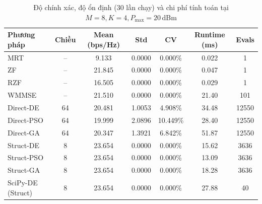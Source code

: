 \documentclass[12pt, a4paper]{article}
\begin{document}
\begin{table}[H]
    \centering
    \caption{Độ chính xác, độ ổn định (30 lần chạy) và chi phí tính toán tại $M=8, K=4, P_{\max}=20$\,dBm}
    \label{tab:stab}
    \begin{tabular}{l c c c c c c}
        \toprule
        \textbf{Phương pháp} & \textbf{Chiều} & \textbf{Mean (bps/Hz)} & \textbf{Std} & \textbf{CV} & \textbf{Runtime (ms)} & \textbf{Evals} \\
        \midrule
        MRT & -- & 9.133 & 0.0000 & 0.000\% & 0.022 & 1 \\
        ZF & -- & 21.845 & 0.0000 & 0.000\% & 0.047 & 1 \\
        RZF & -- & 16.505 & 0.0000 & 0.000\% & 0.029 & 1 \\
        WMMSE & -- & 21.510 & 0.0000 & 0.000\% & 21.40 & 101 \\
        Direct-DE & 64 & 20.481 & 1.0053 & 4.908\% & 34.48 & 12550 \\
        Direct-PSO & 64 & 19.999 & 2.0896 & 10.449\% & 28.40 & 12550 \\
        Direct-GA & 64 & 20.347 & 1.3921 & 6.842\% & 51.87 & 12550 \\
        Struct-DE & 8 & 23.654 & 0.0000 & 0.000\% & 15.62 & 3636 \\
        Struct-PSO & 8 & 23.654 & 0.0000 & 0.000\% & 13.09 & 3636 \\
        Struct-GA & 8 & 23.654 & 0.0000 & 0.000\% & 18.28 & 3636 \\
        SciPy-DE (Struct) & 8 & 23.654 & 0.0000 & 0.000\% & 27.88 & 40 \\
        \bottomrule
    \end{tabular}
\end{table}
\end{document}

